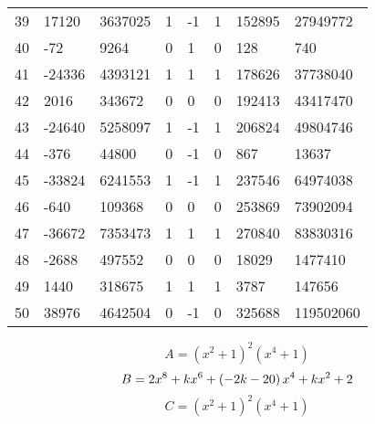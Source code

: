 \documentclass{amsart}
\begin{document}
\begin{longtable}{|l|l|l|lllll|}
39&17120&3637025&1&-1&1&152895&27949772\\
40&-72&9264&0&1&0&128&740\\
41&-24336&4393121&1&1&1&178626&37738040\\
42&2016&343672&0&0&0&192413&43417470\\
43&-24640&5258097&1&-1&1&206824&49804746\\
44&-376&44800&0&-1&0&867&13637\\
45&-33824&6241553&1&-1&1&237546&64974038\\
46&-640&109368&0&0&0&253869&73902094\\
47&-36672&7353473&1&1&1&270840&83830316\\
48&-2688&497552&0&0&0&18029&1477410\\
49&1440&318675&1&1&1&3787&147656\\
50&38976&4642504&0&-1&0&325688&119502060\\
\hline
\end{longtable}
$$A=(x^2
 + 1)^{2}(x^4
 + 1)$$
$$B=2\*x^8
 + k\*x^6
 + \left(-2\*k
 - 20\right) \*x^4
 + k\*x^2
 + 2$$
$$C=(x^2
 + 1)^{2}(x^4
 + 1)$$
\end{document}
